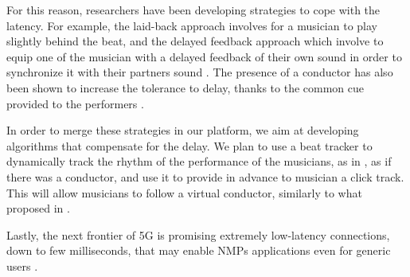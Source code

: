 For this reason, researchers have been developing strategies to cope with the latency. For example, the laid-back approach  involves for a musician to play slightly behind the beat, and the delayed feedback approach which involve to equip one of the musician with a delayed feedback of their own sound in order to synchronize it with their partners sound \cite{Carot07networkmusic}. The presence of a conductor has also been shown to increase the tolerance to delay, thanks to the common cue provided to the performers \cite{Olmos2009}.

In order to merge these strategies in our platform, we aim at developing algorithms that compensate for the delay. We plan to use a beat tracker to dynamically track the rhythm of the performance of the musicians, as in \cite{Goto2010}, as if there was a conductor, and use it to provide in advance to musician a click track. This will allow musicians to follow a virtual conductor, similarly to what proposed in \cite{conductor2008}.
 
Lastly, the next frontier of 5G is promising extremely low-latency connections, down to few milliseconds, that may enable NMPs applications even for generic users \cite{uk5G}.
